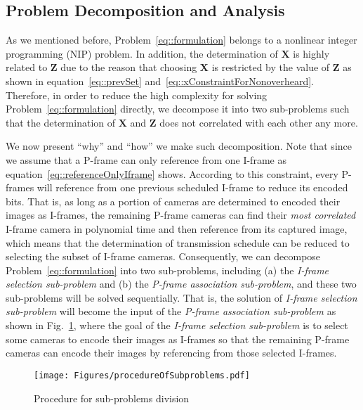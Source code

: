 \subsection{Problem Decomposition and Analysis}
\label{sec::OverallProbAnalysis}
%
As we mentioned before, Problem~\eqref{eq::formulation} belongs to a nonlinear integer programming (NIP) problem.
In addition, the determination of $\mathbf{X}$ is highly related to $\mathbf{Z}$ due to the reason that choosing $\mathbf{X}$ is restricted by the value of $\mathbf{Z}$ as shown in equation~\eqref{eq::prevSet} and~\eqref{eq::xConstraintForNonoverheard}.
Therefore, in order to reduce the high complexity for solving Problem~\eqref{eq::formulation} directly, we decompose it into two sub-problems such that the determination of $\mathbf{X}$ and $\mathbf{Z}$ does not correlated with each other any more.

We now present ``why'' and ``how'' we make such decomposition.
Note that since we assume that a P-frame can only reference from one I-frame as equation~\eqref{eq::referenceOnlyIframe} shows.
According to this constraint, every P-frames will reference from one previous scheduled I-frame to reduce its encoded bits.
That is, as long as a portion of cameras are determined to encoded their images as I-frames, the remaining P-frame cameras can find their \emph{most correlated} I-frame camera in polynomial time and then reference from its captured image, which means that the determination of transmission schedule can be reduced to selecting the subset of I-frame cameras.
Consequently, we can decompose Problem~\eqref{eq::formulation} into two sub-problems, including (a) the \emph{I-frame selection sub-problem} and (b) the \emph{P-frame association sub-problem}, and these two sub-problems will be solved sequentially.
That is, the solution of \emph{I-frame selection sub-problem} will become the input of the \emph{P-frame association sub-problem} as shown in Fig.~\ref{fig::subProbProcedure}, where the goal of the \emph{I-frame selection sub-problem} is to select some cameras to encode their images as I-frames so that the remaining P-frame cameras can encode their images by referencing from those selected I-frames.
%
\begin{figure}
\begin{center}
\texttt{[image: Figures/procedureOfSubproblems.pdf]}
\caption{\label{fig::subProbProcedure}Procedure for sub-problems division}
\end{center}
\end{figure}
%

